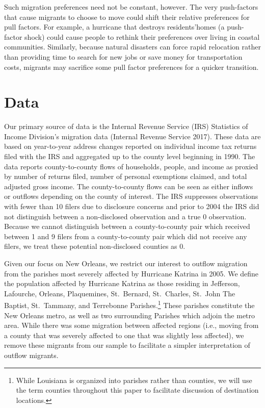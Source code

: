 \documentclass[]{article}
\let\rmarkdownfootnote\footnote%
\def\footnote{\protect\rmarkdownfootnote}
\begin{document}
Such migration preferences need not be constant, however. The very
push-factors that cause migrants to choose to move could shift their
relative preferences for pull factors. For example, a hurricane that
destroys residents'homes (a push-factor shock) could cause people to
rethink their preferences over living in coastal communities. Similarly,
because natural disasters can force rapid relocation rather than
providing time to search for new jobs or save money for transportation
costs, migrants may sacrifice some pull factor preferences for a quicker
transition.

\section{\texorpdfstring{Data \label{sec:data}}{Data }}\label{data}

Our primary source of data is the Internal Revenue Service (IRS)
Statistics of Income Division's migration data (Internal Revenue Service
2017). These data are based on year-to-year address changes reported on
individual income tax returns filed with the IRS and aggregated up to
the county level beginning in 1990. The data reports county-to-county
flows of households, people, and income as proxied by number of returns
filed, number of personal exemptions claimed, and total adjusted gross
income. The county-to-county flows can be seen as either inflows or
outflows depending on the county of interest. The IRS suppresses
observations with fewer than 10 filers due to disclosure concerns and
prior to 2004 the IRS did not distinguish between a non-disclosed
observation and a true 0 observation. Because we cannot distinguish
between a county-to-county pair which received between 1 and 9 filers
from a county-to-county pair which did not receive any filers, we treat
these potential non-disclosed counties as 0.

Given our focus on New Orleans, we restrict our interest to outflow
migration from the parishes most severely affected by Hurricane Katrina
in 2005. We define the population affected by Hurricane Katrina as those
residing in Jefferson, Lafourche, Orleans, Plaquemines, St.~Bernard,
St.~Charles, St.~John The Baptist, St.~Tammany, and Terrebonne
Parishes.\footnote{While Louisiana is organized into parishes rather
  than counties, we will use the term counties throughout this paper to
  facilitate discussion of destination locations.} These parishes
constitute the New Orleans metro, as well as two surrounding Parishes
which adjoin the metro area. While there was some migration between
affected regions (i.e., moving from a county that was severely affected
to one that was slightly less affected), we remove these migrants from
our sample to facilitate a simpler interpretation of outflow migrants.
\end{document}
